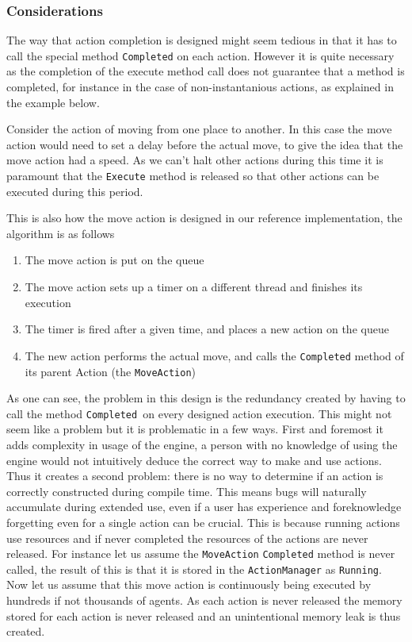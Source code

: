 \subsubsection*{Considerations}

The way that action completion is designed might seem tedious in that
it has to call the special method \texttt{Completed} on each action.
However it is quite necessary as the completion of the execute method
call does not guarantee that a method is completed, for instance in
the case of non-instantanious actions, as explained in the example
below. 

Consider the action of moving from one place to another. In this case
the move action would need to set a delay before the actual move,
to give the idea that the move action had a speed. As we can\textquoteright{}t
halt other actions during this time it is paramount that the \texttt{Execute}
method is released so that other actions can be executed during this
period. 

This is also how the move action is designed in our reference implementation,
the algorithm is as follows
\begin{enumerate}
\item The move action is put on the queue 
\item The move action sets up a timer on a different thread and finishes
its execution
\item The timer is fired after a given time, and places a new action on
the queue
\item The new action performs the actual move, and calls the \texttt{Completed}
method of its parent Action (the \texttt{MoveAction})
\end{enumerate}
As one can see, the problem in this design is the redundancy created
by having to call the method \texttt{Completed }on every designed
action execution. This might not seem like a problem but it is problematic
in a few ways. First and foremost it adds complexity in usage of the
engine, a person with no knowledge of using the engine would not intuitively
deduce the correct way to make and use actions. Thus it creates a
second problem: there is no way to determine if an action is correctly
constructed during compile time. This means bugs will naturally accumulate
during extended use, even if a user has experience and foreknowledge
forgetting even for a single action can be crucial. This is because
running actions use resources and if never completed the resources
of the actions are never released. For instance let us assume the
\texttt{MoveAction} \texttt{Completed} method is never called, the
result of this is that it is stored in the \texttt{ActionManager}
as \texttt{Running}. Now let us assume that this move action is continuously
being executed by hundreds if not thousands of agents. As each action
is never released the memory stored for each action is never released
and an unintentional memory leak is thus created.

